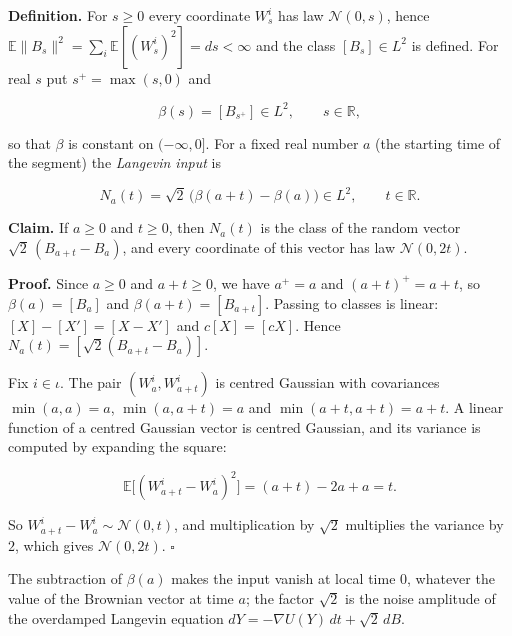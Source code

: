 \documentclass[11pt,a4paper]{article}
\begin{document}
\textbf{Definition.} For \(s\ge0\) every coordinate \(W^i_s\) has law \(\mathcal N(0,s)\), hence \(\mathbb E\|B_s\|^2=\sum_{i}\mathbb E[(W^i_s)^2]=ds<\infty\) and the class \([B_s]\in L^2\) is defined. For real \(s\) put \(s^+=\max(s,0)\) and


\[\beta(s)=[B_{s^+}]\in L^2,\qquad s\in\mathbb R,\]


so that \(\beta\) is constant on \((-\infty,0]\). For a fixed real number \(a\) (the starting time of the segment) the \emph{Langevin input} is


\[N_a(t)=\sqrt2\,\bigl(\beta(a+t)-\beta(a)\bigr)\in L^2,\qquad t\in\mathbb R.\]


\textbf{Claim.} If \(a\ge0\) and \(t\ge0\), then \(N_a(t)\) is the class of the random vector \(\sqrt2\,(B_{a+t}-B_a)\), and every coordinate of this vector has law \(\mathcal N(0,2t)\).




\textbf{Proof.} Since \(a\ge0\) and \(a+t\ge0\), we have \(a^+=a\) and \((a+t)^+=a+t\), so \(\beta(a)=[B_a]\) and \(\beta(a+t)=[B_{a+t}]\). Passing to classes is linear: \([X]-[X']=[X-X']\) and \(c[X]=[cX]\). Hence \(N_a(t)=[\sqrt2(B_{a+t}-B_a)]\).




Fix \(i\in\iota\). The pair \((W^i_a,W^i_{a+t})\) is centred Gaussian with covariances \(\min(a,a)=a\), \(\min(a,a+t)=a\) and \(\min(a+t,a+t)=a+t\). A linear function of a centred Gaussian vector is centred Gaussian, and its variance is computed by expanding the square:


\[\mathbb E\bigl[(W^i_{a+t}-W^i_a)^2\bigr]=(a+t)-2a+a=t.\]


So \(W^i_{a+t}-W^i_a\sim\mathcal N(0,t)\), and multiplication by \(\sqrt2\) multiplies the variance by \(2\), which gives \(\mathcal N(0,2t)\). \(\square\)




The subtraction of \(\beta(a)\) makes the input vanish at local time \(0\), whatever the value of the Brownian vector at time \(a\); the factor \(\sqrt2\) is the noise amplitude of the overdamped Langevin equation \(dY=-\nabla U(Y)\,dt+\sqrt2\,dB\).
\end{document}
